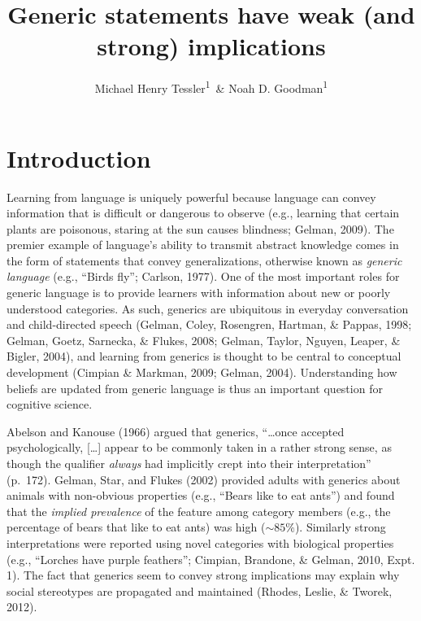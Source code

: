 \documentclass[floatsintext,doc]{apa6}
\title{Generic statements have weak (and strong) implications}
\author{Michael Henry Tessler\textsuperscript{1}~\& Noah D. Goodman\textsuperscript{1}}
\affiliation{
    \vspace{0.5cm}
          \textsuperscript{1} Department of Psychology, Stanford University  }
\theoremstyle{definition}
\theoremstyle{definition}
\theoremstyle{definition}
\theoremstyle{remark}
\begin{document}
\maketitle

\setcounter{secnumdepth}{0}



\newcommand{\denote}[1]{\mbox{ $[\![ #1 ]\!]$}}
\newcommand*\diff{\mathop{}\!\mathrm{d}}

 

\newcommand{\mht}[1]{{\textcolor{Blue}{[mht: #1]}}}
\newcommand{\ndg}[1]{{\textcolor{Green}{[ndg: #1]}}}
\newcommand{\red}[1]{{\textcolor{Red}{#1}}}







\section{Introduction}\label{introduction}

Learning from language is uniquely powerful because language can convey
information that is difficult or dangerous to observe (e.g., learning
that certain plants are poisonous, staring at the sun causes blindness;
Gelman, 2009). The premier example of language's ability to transmit
abstract knowledge comes in the form of statements that convey
generalizations, otherwise known as \emph{generic language} (e.g.,
``Birds fly''; Carlson, 1977). One of the most important roles for
generic language is to provide learners with information about new or
poorly understood categories. As such, generics are ubiquitous in
everyday conversation and child-directed speech (Gelman, Coley,
Rosengren, Hartman, \& Pappas, 1998; Gelman, Goetz, Sarnecka, \& Flukes,
2008; Gelman, Taylor, Nguyen, Leaper, \& Bigler, 2004), and learning
from generics is thought to be central to conceptual development
(Cimpian \& Markman, 2009; Gelman, 2004). Understanding how beliefs are
updated from generic language is thus an important question for cognitive
science.

Abelson and Kanouse (1966) argued that generics, \enquote{\ldots{}once
accepted psychologically, {[}\ldots{}{]} appear to be commonly taken in
a rather strong sense, as though the qualifier \emph{always} had
implicitly crept into their interpretation} (p.~172). Gelman, Star, and
Flukes (2002) provided adults with generics about animals with
non-obvious properties (e.g., \enquote{Bears like to eat ants}) and
found that the \emph{implied prevalence} of the feature among category
members (e.g., the percentage of bears that like to eat ants) was high
(\(\sim 85\%\)). Similarly strong interpretations were reported using
novel categories with biological properties (e.g., ``Lorches have purple
feathers''; Cimpian, Brandone, \& Gelman, 2010, Expt. 1). The fact that
generics seem to convey strong implications may explain why social stereotypes are propagated and maintained (Rhodes,
Leslie, \& Tworek, 2012).
\end{document}
